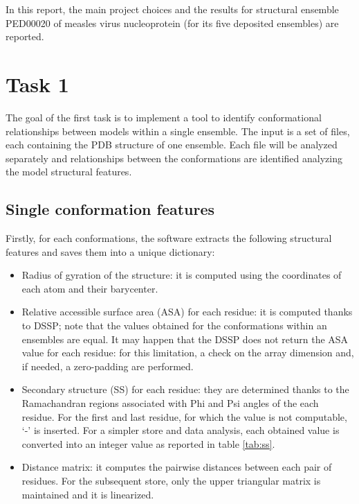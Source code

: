 In this report, the main project choices and the results for structural ensemble PED00020 of measles virus nucleoprotein (for its five deposited ensembles) are reported.

\section{Task 1}\label{sec:task1}
\graphicspath{ {./figures/} }

The goal of the first task is to implement a tool to identify conformational relationships between models within a single ensemble. The input is a set of files, each containing the PDB structure of one ensemble. Each file will be analyzed separately and relationships between the conformations are identified analyzing the model structural features. 


\subsection{Single conformation features}

Firstly, for each conformations, the software extracts the following structural features and saves them into a unique dictionary:
\begin{itemize}
\item Radius of gyration of the structure: it is computed using the coordinates of each atom and their barycenter.
\item Relative accessible surface area (ASA) for each residue: it is computed thanks to DSSP; note that the values obtained for the conformations within an ensembles are equal. It may happen that the DSSP does not return the ASA value for each residue: for this limitation, a check on the array dimension and, if needed, a zero-padding are performed. 
\item Secondary structure (SS) for each residue: they are determined thanks to the Ramachandran regions associated with Phi and Psi angles of the each residue. For the first and last residue, for which the value is not computable, `-' is inserted. For a simpler store and data analysis, each obtained value is converted into an integer value as reported in table \ref{tab:ss}. 
\item Distance matrix: it computes the pairwise distances between each pair of residues. For the subsequent store, only the upper triangular matrix is maintained and it is linearized. 
\end{itemize}

